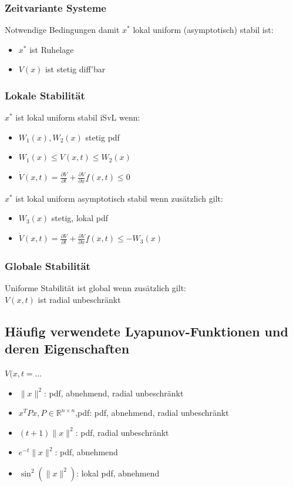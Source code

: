 \documentclass[german]{latex4ei/latex4ei_sheet}
\begin{document}
\subsubsection*{Zeitvariante Systeme}
Notwendige Bedingungen damit $x^*$ lokal uniform (asymptotisch) stabil ist:
\begin{itemize}
  \item $x^*$ ist Ruhelage
  \item $V(x)$ ist stetig diff'bar
\end{itemize}

\subsubsection*{Lokale Stabilität}
$x^*$ ist lokal uniform stabil iSvL wenn:
\begin{itemize}
  \item $W_1(x), W_2(x)$ stetig pdf
  \item $W_1(x) \leq V(x,t) \leq W_2(x)$
  \item $\dot{V}(x,t) = \frac{\partial V}{\partial t} + \frac{\partial V}{\partial \underline{x}} \underline{f}(x,t) \leq 0$
\end{itemize}

$x^*$ ist lokal uniform asymptotisch stabil wenn zusätzlich gilt:
\begin{itemize}
  \item $W_3(x)$ stetig, lokal pdf
  \item $\dot{V}(x,t) = \frac{\partial V}{\partial t} + \frac{\partial V}{\partial \underline{x}} \underline{f}(x,t) \leq -W_3(x)$
\end{itemize}

\subsubsection*{Globale Stabilität}
Uniforme Stabilität ist global wenn zusätzlich gilt: \\
$V(x,t)$ ist radial unbeschränkt


\subsection{Häufig verwendete Lyapunov-Funktionen und deren Eigenschaften}
$V(x,t = \dots$
\begin{itemize}
  \item $\|x\|^2$: pdf, abnehmend, radial unbeschränkt
  \item $x^T P x, P \in \mathbb{R}^{n \times n}$,pdf: pdf, abnehmend, radial unbeschränkt
  \item $(t+1) \|x\|^2$: pdf, radial unbeschränkt
  \item $e^{-t}\|x\|^2$: pdf, abnehmend
  \item $\sin^2(\|x\|^2)$: lokal pdf, abnehmend
\end{itemize}
\end{document}
